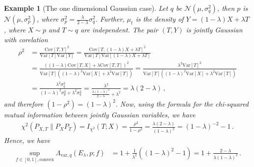 \documentclass{article}
\theoremstyle{plain}
\theoremstyle{definition}
\theoremstyle{plain}
\newtheorem{exampleinner}[theorem]{Example}
\newenvironment{example}[1][]{%
    \begin{mdframed}[style=examplestyle]%
    \begin{exampleinner}[#1]%
}{%
    \end{exampleinner}%
    \end{mdframed}%
}
\newcommand{\cN}{\mathcal N}
\begin{document}
\begin{example}[The one dimensional Gaussian case]
    Let $q$ be $\cN(\mu, \sigma_q^2)$, then $p$ is $\cN(\mu, \sigma_p^2)$,
    where $\sigma_p^2 = \frac{\lambda}{2-\lambda} \sigma_q^2$.
    Further, $\mu_t$ is the density of $Y = (1 - \lambda) X + \lambda T$,
    where $X \sim p$ and $T \sim q$ are independent.
    The pair $(T,Y)$ is jointly Gaussian with corelation
    \begin{align}
        \rho^2
         & = \frac{\mathrm{Cov}[T,Y]^2}{\mathrm{Var}[T]\mathrm{Var}[Y]}
        = \frac{\mathrm{Cov}[T, (1-\lambda) X + \lambda T]^2}{\mathrm{Var}[T]\mathrm{Var}[(1-\lambda)X + \lambda T]} \\
         & = \frac{\left((1-\lambda) \mathrm{Cov}[T, X] + \lambda \mathrm{Cov}[T, T] \right)^2}{
            \mathrm{Var}[T]
            \left(
            (1-\lambda)^2 \mathrm{Var}[X] + \lambda^2 \mathrm{Var}[T]
            \right)
        }
        = \frac{\lambda^2 \mathrm{Var}[T]^2}{
            \mathrm{Var}[T]
            \left(
            (1-\lambda)^2 \mathrm{Var}[X] + \lambda^2 \mathrm{Var}[T]
            \right)
        }                                                                                                            \\
         & = \frac{\lambda^2\sigma_q^2}{
            (1-\lambda)^2 \sigma_p^2 + \lambda^2 \sigma_q^2
        }
        = \frac{\lambda^2}{
            \frac{\lambda(1-\lambda)^2}{2-\lambda} + \lambda^2
        } = \lambda(2 - \lambda)\,,
    \end{align}
    and therefore $(1 - \rho^2) = (1-\lambda)^2$.
    Now, using the formula for the chi-squared mutual information between jointly Gaussian variables, we have
    \begin{align}
        \chi^2(P_{X,T} \| P_X P_T) = I_{\chi^2}(T;X) = \frac{\rho^2}{1-\rho^2} = \frac{\lambda(2-\lambda)}{(1-\lambda)^2}
        =(1 - \lambda)^{-2} - 1\,.
    \end{align}
    Hence, we have
    \begin{align}
        \sup_{f \in [0,1], \textrm{convex}}\Lambda_{\text{var}, q}(E_\lambda, p; f)
         & = 1 + \frac{1}{\lambda^2} \left(
        (1 - \lambda)^2 - 1
        \right)
        = 1 + \frac{2 - \lambda}{\lambda (1-\lambda)^2}\,.
    \end{align}
\end{example}
\end{document}
